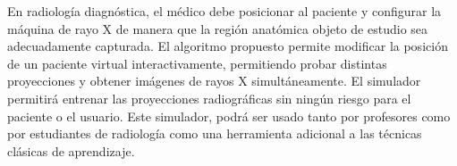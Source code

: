 \begin{itemize}
\begin{itemize}
En radiología diagnóstica, el médico debe posicionar al paciente y configurar la máquina de rayo X de manera que la región anatómica objeto de estudio sea adecuadamente capturada. El algoritmo propuesto permite modificar la posición de un paciente virtual interactivamente, permitiendo probar distintas proyecciones y obtener imágenes de rayos X simultáneamente. El simulador permitirá entrenar las proyecciones radiográficas sin ningún riesgo para el paciente o el usuario. Este simulador, podrá ser usado tanto por profesores como por estudiantes de radiología como una herramienta adicional a las técnicas clásicas de aprendizaje.
\end{itemize}

\end{itemize}





